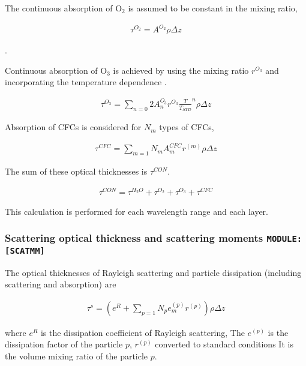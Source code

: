 The continuous absorption of O\(_2\) is assumed to be constant in the
mixing ratio,

\begin{eqnarray}
\tau^{O_2} = A^{O_2} \rho \Delta z
\end{eqnarray}

.

Continuous absorption of O\(_3\) is achieved by using the mixing ratio
\(r^{O_3}\) and incorporating the temperature dependence .

\begin{eqnarray}
\tau^{O_3} = \sum_{n=0}{2} A^{O_3}_n r^{O_3} \frac{T}{T_{STD}}^n \rho \Delta z
\end{eqnarray}

Absorption of CFCs is considered for \(N_m\) types of CFCs,

\begin{eqnarray}
\tau^{CFC} = \sum_{m=1}{N_m} A^{CFC}_m r^{(m)} \rho \Delta z
\end{eqnarray}

The sum of these optical thicknesses is \(\tau^{CON}\).

\begin{eqnarray}
 \tau^{CON} =  \tau^{H_2O} + \tau^{O_2} + \tau^{O_3} + \tau^{CFC} 
\end{eqnarray}

This calculation is performed for each wavelength range and each layer.

\hypertarget{scattering-optical-thickness-and-scattering-moments-modulescatmm}{%
\subsubsection{\texorpdfstring{Scattering optical thickness and
scattering moments
\texttt{MODULE:{[}SCATMM{]}}}{Scattering optical thickness and scattering moments MODULE:{[}SCATMM{]}}}\label{scattering-optical-thickness-and-scattering-moments-modulescatmm}}

The optical thicknesses of Rayleigh scattering and particle dissipation
(including scattering and absorption) are

\begin{eqnarray}
\tau^{s} 
 = \left( e^R + \sum_{p=1}{N_p} e^{(p)}_m r^{(p)}\right) \rho \Delta z
\end{eqnarray}

where \(e^R\) is the dissipation coefficient of Rayleigh scattering, The
\(e^{(p)}\) is the dissipation factor of the particle \(p\), \(r^{(p)}\)
converted to standard conditions It is the volume mixing ratio of the
particle \(p\).

